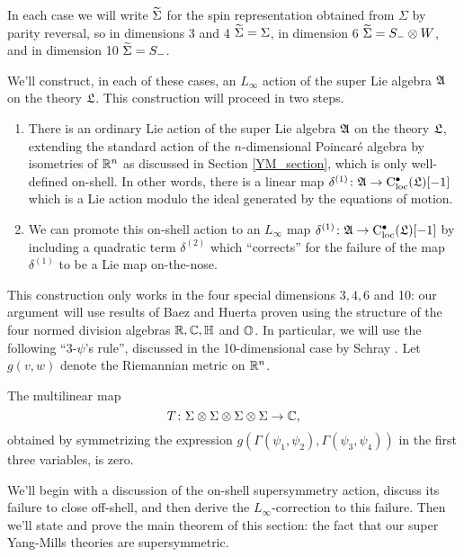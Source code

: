 \documentclass[10pt, oneside]{article}
\begin{document}
\begin{definition}
In each case we will write $\widetilde{\Sigma}$ for the spin representation obtained from $\Sigma$ by parity reversal, so in dimensions 3 and 4 $\widetilde{\Sigma} = \Sigma$, in dimension 6 $\widetilde{\Sigma} = S_- \otimes W$, and in dimension 10 $\widetilde{\Sigma} = S_-$.
\end{definition}

We'll construct, in each of these cases, an $L_\infty$ action of the super Lie algebra $\mathfrak{A}$ on the theory $\mathfrak L$.  This construction will proceed in two steps.
\begin{enumerate}
 \item There is an ordinary Lie action of the super Lie algebra $\mathfrak{A}$ on the theory $\mathfrak L$, extending the standard action of the $n$-dimensional Poincar\'e algebra by isometries of $\mathbb R^{n}$ as discussed in Section \ref{YM_section}, which is only well-defined on-shell.  In other words, there is a linear map $\delta^{(1)} \colon \mathfrak{A} \to {\rm C}_{\rm loc}^\bullet(\mathfrak L)[-1]$ which is a Lie action modulo the ideal generated by the equations of motion.
 \item We can promote this on-shell action to an $L_\infty$ map $\delta^{(1)} \colon \mathfrak{A} \to {\rm C}_{\rm loc}^\bullet(\mathfrak L)[-1]$ by including a quadratic term $\delta^{(2)}$ which ``corrects'' for the failure of the map $\delta^{(1)}$ to be a Lie map on-the-nose.
\end{enumerate}
This construction only works in the four special dimensions $3,4,6$ and 10: our argument will use results of Baez and Huerta \cite{BaezHuerta} proven using the structure of the four normed division algebras $\mathbb R, \mathbb C, \mathbb{H}$ and $\mathbb{O}$.  In particular, we will use the following ``3-$\psi$'s rule'', discussed in the 10-dimensional case by Schray \cite{Schray} .  Let $g(v,w)$ denote the Riemannian metric on $\mathbb R^n$.

\begin{theorem} \label{3_psi_thm}
The multilinear map 
\[T \colon \Sigma \otimes \Sigma \otimes \Sigma \otimes \Sigma \to \mathbb C,\]
obtained by symmetrizing the expression $g(\Gamma(\psi_1,\psi_2), \Gamma(\psi_3, \psi_4))$ in the first three variables, is zero.
\end{theorem}

We'll begin with a discussion of the on-shell supersymmetry action, discuss its failure to close off-shell, and then derive the $L_\infty$-correction to this failure.  Then we'll state and prove the main theorem of this section: the fact that our super Yang-Mills theories are supersymmetric.
\end{document}
